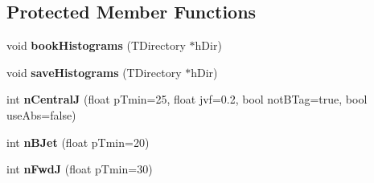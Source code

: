 \subsection*{Protected Member Functions}
\begin{DoxyCompactItemize}
\item 
\hypertarget{classToyNt__ZXStudies_ae59e95a4ce6251d4538f296d759200b0}{
void {\bfseries bookHistograms} (TDirectory $\ast$hDir)}
\label{classToyNt__ZXStudies_ae59e95a4ce6251d4538f296d759200b0}

\item 
\hypertarget{classToyNt__ZXStudies_af4bd79dcb3d639fdb220c1279d84f57b}{
void {\bfseries saveHistograms} (TDirectory $\ast$hDir)}
\label{classToyNt__ZXStudies_af4bd79dcb3d639fdb220c1279d84f57b}

\item 
\hypertarget{classToyNt__ZXStudies_a6bb336df0cc42d06617d41853d27825e}{
int {\bfseries nCentralJ} (float pTmin=25, float jvf=0.2, bool notBTag=true, bool useAbs=false)}
\label{classToyNt__ZXStudies_a6bb336df0cc42d06617d41853d27825e}

\item 
\hypertarget{classToyNt__ZXStudies_ad7faa5b2b7cfa9d57ddfa007f16dedf1}{
int {\bfseries nBJet} (float pTmin=20)}
\label{classToyNt__ZXStudies_ad7faa5b2b7cfa9d57ddfa007f16dedf1}

\item 
\hypertarget{classToyNt__ZXStudies_a533cf593e33bdf493ae89a85b782ee29}{
int {\bfseries nFwdJ} (float pTmin=30)}
\label{classToyNt__ZXStudies_a533cf593e33bdf493ae89a85b782ee29}

\end{DoxyCompactItemize}
